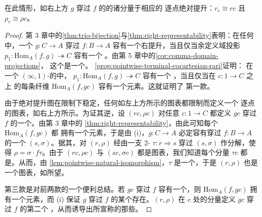 \begin{proposition}
\begin{enumerate}[label=(\roman*)]
\begin{center}
\end{center}
  在此情形，如右上方 $g$ 穿过 $f$ 的\trAbsoluteRightLifting{}的诸分量\trIsomorphism{}于相应的
  逐点绝对提升：$r_{c}\cong rc$ 且 $\rho_{c}\cong\rho c$。
\end{enumerate}
\end{proposition}

\begin{proof}
第 3 章中的\cref{thm:trio-bijection}与\cref{thm:right-representability}表明：在任何\trInfinityCosmos{}中，一个\trFunctor{}
$g\colon C\to A$ 穿过 $f\colon B\to A$ 容有一个右提升，当且仅当余定义域投影%
\trFunctor{} $p_{1}\colon\mathrm{Hom}_{A}(f,g)\twoheadrightarrow C$ 容有一个%
\trRightAdjoint\trRightInverse。由第 5 章中的\cref{cor:comma-domain-projections}，
这个\trFunctor{}是一个\trCocartesianFibration。%
\cref{prop:pointwise-terminal-cocartesian-rari}证明：
在一个 $(\infty,1)$-\trCategory{}的\trInfinityCosmos{}中，
$p_{1}\colon\mathrm{Hom}_{A}(f,g)\twoheadrightarrow C$ 容有一个%
\trRightAdjoint\trRightInverse，当且仅当在\trElement{} $c\colon 1\to C$ 之上
的每条纤维 $\mathrm{Hom}_{A}(f,gc)$ 容有一个\trTerminal{}元素。这就证明了
第一款。

由于绝对提升图在限制下稳定，任何如左上方所示的\trAbsoluteRightLifting{}图表都限制而定义一个
逐点的\trAbsoluteRightLifting{}图表，如右上方所示。为证其逆，设 $(rc,\rho c)$ 对任意%
\trElement{} $c\colon 1\to C$ 都定义 $gc$ 穿过 $f$ 的一个\trAbsoluteRightLifting。由第 3 章中的%
\cref{thm:right-representability}，由此可知每个\trCommaInfinityCategory{} $\mathrm{Hom}_{A}(f,gc)$ 都
拥有一个\trTerminal{}元素，于是由 (i)，$g\colon C\to A$ 必定容有穿过
$f\colon B\to A$ 的一个\trAbsoluteRightLifting{} $(s,\sigma)$。据其\trUniversalProperty，对
$(r,\rho)$ 经由一支 2-\trCell{} $\tau\colon r\Rightarrow s$ 穿过 $(s,\sigma)$
作分解，使得 $\rho=\sigma\cdot f\tau$。由于 $(rc,\rho c)$ 与 $(sc,\sigma c)$
都是\trAbsoluteRightLifting{}图表，我们知道每个分量 $\tau c$ 都是\trIsomorphism。从而，由%
\cref{lem:pointwise-natural-isomorphism}，$\tau$ 是一个\trIsomorphism，于是
$(r,\rho)$ 也是一个\trAbsoluteRightLifting{}图表，如所望。

第三款是对前两款的一个便利总结。若 $gc$ 穿过 $f$ 容有一个\trAbsoluteRightLifting，则
$\mathrm{Hom}_{A}(f,gc)$ 拥有一个\trTerminal{}元素，而 (i) 保证 $g$ 穿过 $f$
的某个\trAbsoluteRightLifting{}存在。$(r,\rho)$ 在 $c$ 处的分量定义 $gc$ 穿过 $f$ 的第二个%
\trAbsoluteRightLifting，从而诱导出所宣称的那些\trIsomorphism。
\end{proof}

